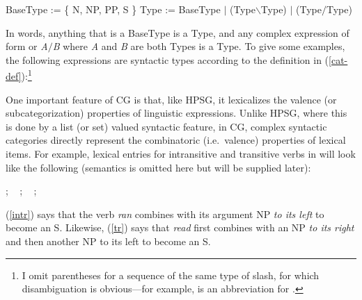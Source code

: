 \documentclass[output=paper
                ,modfonts
 	        ,biblatex
                ,babelshorthands
                ,newtxmath
                ,draftmode
                ,colorlinks, citecolor=brown
]{langscibook}
\begin{document}
\begin{exe}
 \ex\label{cat-def}
  \begin{xlist}
 \ex\label{bascat}
    BaseType := \{ N,  NP, PP, S \}
 \ex\label{complex-cat}
    Type := BaseType $|$ (Type\ensuremath{\backslash}Type) $|$ (Type\ensuremath{/}Type)
  \end{xlist}
\end{exe}
In words, anything that is a BaseType is a Type, and
any complex expression of form
  or
\textit{A}\ensuremath{/}\textit{B} where \textit{A} and \textit{B} are both
Types is a Type. To give some examples, the following expressions are
syntactic types according to the definition in
(\ref{cat-def}):\footnote{I omit
parentheses for a sequence of the same type of slash, for which
disambiguation is obvious---for example,  is an abbreviation for .}

\begin{exe}
 \ex
  \begin{xlist}
 \ex
 \ex
 \ex
 \ex
  \end{xlist}
\end{exe}

One important feature of CG is that, like HPSG, it lexicalizes the
valence (or subcategorization) properties of linguistic expressions.
Unlike HPSG, where this is done by a list (or set) valued syntactic
feature, in CG, complex syntactic categories directly represent the
combinatoric (i.e.~valence) properties of lexical items. For example,
lexical entries for intransitive and transitive verbs in  will
look like the following (semantics is omitted here but will be
supplied later):

\begin{exe}
 \ex\label{lex1}
  \begin{xlist}
 \ex\label{intr}
    ; \  
 \ex\label{tr}
    ; \ 
 \ex\label{trthree}
    ; \ 
  \end{xlist}
\end{exe}
(\ref{intr}) says that the verb \textit{ran} combines with its argument NP \emph{to its
left} to become an S. Likewise, (\ref{tr}) says that \textit{read} first
combines with an NP \emph{to its right} and then another NP to its left to
become an S.
\end{document}
